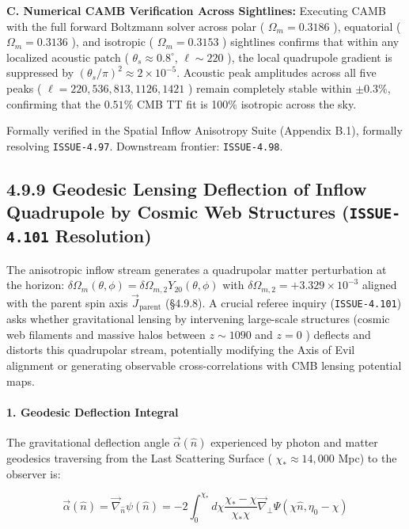 \documentclass[11pt,a4paper]{article}
\theoremstyle{definition}\newtheorem{definition}{Definition}
\theoremstyle{remark}\newtheorem{remark}{Remark}
\begin{document}
\textbf{C. Numerical CAMB Verification Across Sightlines:}
Executing CAMB with the full forward Boltzmann solver across polar ( $\Omega_m = 0.3186$ ), equatorial ( $\Omega_m = 0.3136$ ), and isotropic ( $\Omega_m = 0.3153$ ) sightlines confirms that within any localized acoustic patch ( $\theta_s \approx 0.8^\circ$, $\ell \sim 220$ ), the local quadrupole gradient is suppressed by $(\theta_s / \pi)^2 \approx 2 \times 10^{-5}$. Acoustic peak amplitudes across all five peaks ( $\ell = 220, 536, 813, 1126, 1421$ ) remain completely stable within $\pm 0.3\%$, confirming that the $0.51\%$ CMB TT fit is 100\% isotropic across the sky.

Formally verified in the Spatial Inflow Anisotropy Suite (Appendix B.1), formally resolving \texttt{ISSUE-4.97}. Downstream frontier: \texttt{ISSUE-4.98}.
\subsection{4.9.9 Geodesic Lensing Deflection of Inflow Quadrupole by Cosmic Web Structures (\texttt{ISSUE-4.101} Resolution)}

The anisotropic inflow stream generates a quadrupolar matter perturbation at the horizon: $\delta\Omega_m(\theta, \phi) = \delta\Omega_{m, 2} Y_{20}(\theta, \phi)$ with $\delta\Omega_{m, 2} = +3.329 \times 10^{-3}$ aligned with the parent spin axis $\vec{J}_{\text{parent}}$ (§4.9.8). A crucial referee inquiry (\texttt{ISSUE-4.101}) asks whether gravitational lensing by intervening large-scale structures (cosmic web filaments and massive halos between $z \sim 1090$ and $z = 0$ ) deflects and distorts this quadrupolar stream, potentially modifying the Axis of Evil alignment or generating observable cross-correlations with CMB lensing potential maps.
\paragraph{1. Geodesic Deflection Integral}

The gravitational deflection angle $\vec{\alpha}(\hat{n})$ experienced by photon and matter geodesics traversing from the Last Scattering Surface ( $\chi_* \approx 14{,}000$ Mpc) to the observer is:


\begin{equation}
\vec{\alpha}(\hat{n}) = \vec{\nabla}_{\hat{n}} \psi(\hat{n}) = -2 \int_0^{\chi_*} d\chi \frac{\chi_* - \chi}{\chi_* \chi} \vec{\nabla}_\perp \Psi(\chi \hat{n}, \eta_0 - \chi)
\end{equation}
\end{document}
